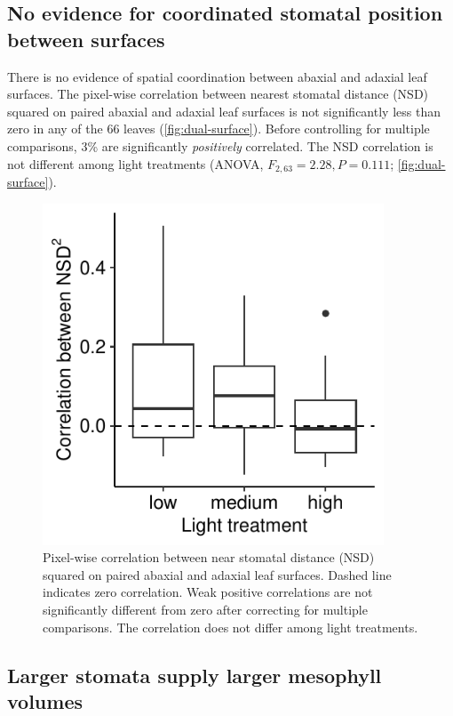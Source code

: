 \documentclass[webpdf,large,modern,unnumsec,namedate]{oup-authoring-template}
\begin{document}
\subsection{No evidence for coordinated stomatal position between
surfaces}\label{no-evidence-for-coordinated-stomatal-position-between-surfaces}

There is no evidence of spatial coordination between abaxial and adaxial
leaf surfaces. The pixel-wise correlation between nearest stomatal
distance (NSD) squared on paired abaxial and adaxial leaf surfaces is
not significantly less than zero in any of the 66 leaves
(\autoref{fig:dual-surface}). Before controlling for multiple
comparisons, 3\% are significantly \emph{positively} correlated. The NSD
correlation is not different among light treatments (ANOVA,
\(F_{2,63} = 2.28, P = 0.111\); \autoref{fig:dual-surface}).

\begin{figure}[ht]
\includegraphics[width = 4in]{figures/dual-surface.pdf}
\caption{Pixel-wise correlation between near stomatal distance (NSD) squared on paired abaxial and adaxial leaf surfaces. Dashed line indicates zero correlation. Weak positive correlations are not significantly different from zero after correcting for multiple comparisons. The correlation does not differ among light treatments.}
\label{fig:dual-surface}
\end{figure}

\subsection{Larger stomata supply larger mesophyll
volumes}\label{larger-stomata-supply-larger-mesophyll-volumes}
\end{document}
